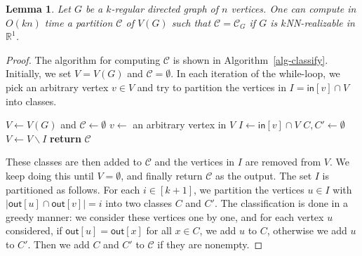 \documentclass[11pt]{article}
\newtheorem{lemma}{Lemma}
\begin{document}
\begin{lemma} \label{lem-classify}
    Let $G$ be a $k$-regular directed graph of $n$ vertices.
    One can compute in $O(kn)$ time a partition $\mathcal{C}$ of $V(G)$ such that $\mathcal{C} = \mathcal{C}_G$ if $G$ is $k$NN-realizable in $\mathbb{R}^1$.
\end{lemma}

\begin{proof}
The algorithm for computing $\mathcal{C}$ is shown in Algorithm~\ref{alg-classify}.
Initially, we set $V = V(G)$ and $\mathcal{C} = \emptyset$.
In each iteration of the while-loop, we pick an arbitrary vertex $v \in V$ and try to partition the vertices in $I = \mathsf{in}[v] \cap V$ into classes.
\begin{algorithm}[t]
    \caption{\textsc{Classify}$(G)$}
    \begin{algorithmic}[1]
        \State $V \leftarrow V(G)$ and $\mathcal{C} \leftarrow \emptyset$
            \State $v \leftarrow$ an arbitrary vertex in $V$
            \State $I \leftarrow \mathsf{in}[v] \cap V$
                \State $C,C' \leftarrow \emptyset$
                    \EndIf
                \EndFor
                \EndIf
                \EndIf
            \EndFor
            \State $V \leftarrow V \backslash I$
        \EndWhile
        \State \textbf{return} $\mathcal{C}$
    \end{algorithmic}
    \label{alg-classify}
\end{algorithm}
These classes are then added to $\mathcal{C}$ and the vertices in $I$ are removed from $V$.
We keep doing this until $V = \emptyset$, and finally return $\mathcal{C}$ as the output.
The set $I$ is partitioned as follows.
For each $i \in [k+1]$, we partition the vertices $u \in I$ with $|\mathsf{out}[u] \cap \mathsf{out}[v]| = i$ into two classes $C$ and $C'$.
The classification is done in a greedy manner: we consider these vertices one by one, and for each vertex $u$ considered, if $\mathsf{out}[u] = \mathsf{out}[x]$ for all $x \in C$, we add $u$ to $C$, otherwise we add $u$ to $C'$.
Then we add $C$ and $C'$ to $\mathcal{C}$ if they are nonempty.


\end{proof}
\end{document}
